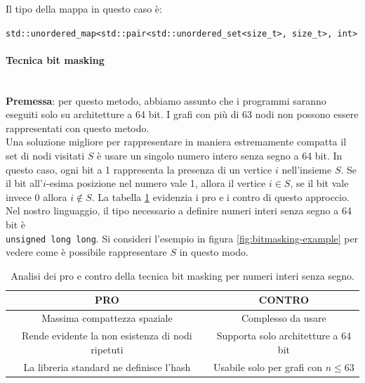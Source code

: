 \noindent Il tipo della mappa in questo caso è:

\begin{center}
    \texttt{std::unordered_map<std::pair<std::unordered_set<size_t>, size_t>, int>}
\end{center}

\paragraph{Tecnica bit masking}\mbox{}\\

\noindent \textbf{Premessa}: per questo metodo, abbiamo assunto che i programmi saranno eseguiti solo su architetture a 64 bit. I grafi con più di 63 nodi non possono essere rappresentati con questo metodo. \\

\noindent Una soluzione migliore per rappresentare in maniera estremamente compatta il set di nodi visitati $S$ è usare un singolo numero intero senza segno a 64 bit. In questo caso, ogni bit a 1 rappresenta la presenza di un vertice $i$ nell'insieme $S$.
Se il bit all'$i$-esima posizione nel numero vale 1, allora il vertice $i \in S$, se il bit vale invece 0 allora $i \notin S$. La tabella \ref{tab:pro-cons-bit-masking} evidenzia i pro e i contro di questo approccio. \\

\noindent Nel nostro linguaggio, il tipo necessario a definire numeri interi senza segno a 64 bit è \\
\texttt{unsigned long long}. Si consideri l'esempio in figura \ref{fig:bitmasking-example} per vedere come è possibile rappresentare $S$ in questo modo.

\begin{table}[h]
  \centering
    \begin{tabular}{|c | c|}
    \hline
    \textbf{PRO} & \textbf{CONTRO} \\ [0.5ex]
    \hline\hline
    Massima compattezza spaziale & Complesso da usare \\
    \hline
    Rende evidente la non esistenza di nodi ripetuti & Supporta solo architetture a 64 bit \\
    \hline
    La libreria standard ne definisce l'hash & Usabile solo per grafi con $n \leq 63$ \\
    \hline
  \end{tabular}
    \caption{Analisi dei pro e contro della tecnica bit masking per numeri interi senza segno.}
    \label{tab:pro-cons-bit-masking}
\end{table}

